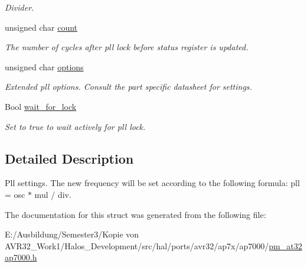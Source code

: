 \begin{CompactItemize}
\begin{CompactList}\small\item\em Divider. \item\end{CompactList}\item 
\hypertarget{structpm__pll__opt__t_11ff9f83ef3be9fda30369640c0a4017}{
unsigned char \hyperlink{structpm__pll__opt__t_11ff9f83ef3be9fda30369640c0a4017}{count}}
\label{structpm__pll__opt__t_11ff9f83ef3be9fda30369640c0a4017}

\begin{CompactList}\small\item\em The number of cycles after pll lock before status register is updated. \item\end{CompactList}\item 
\hypertarget{structpm__pll__opt__t_8b17faeaff4786ba22e3192e35e847be}{
unsigned char \hyperlink{structpm__pll__opt__t_8b17faeaff4786ba22e3192e35e847be}{options}}
\label{structpm__pll__opt__t_8b17faeaff4786ba22e3192e35e847be}

\begin{CompactList}\small\item\em Extended pll options. Consult the part specific datasheet for settings. \item\end{CompactList}\item 
\hypertarget{structpm__pll__opt__t_8c3eee8741e28978aa4a3618307499a2}{
Bool \hyperlink{structpm__pll__opt__t_8c3eee8741e28978aa4a3618307499a2}{wait\_\-for\_\-lock}}
\label{structpm__pll__opt__t_8c3eee8741e28978aa4a3618307499a2}

\begin{CompactList}\small\item\em Set to true to wait actively for pll lock. \item\end{CompactList}\end{CompactItemize}


\subsection{Detailed Description}
Pll settings. The new frequency will be set according to the following formula: pll = osc $\ast$ mul / div. 

The documentation for this struct was generated from the following file:\begin{CompactItemize}
\item 
E:/Ausbildung/Semester3/Kopie von AVR32\_\-Work1/Halos\_\-Development/src/hal/ports/avr32/ap7x/ap7000/\hyperlink{pm__at32ap7000_8h}{pm\_\-at32ap7000.h}\end{CompactItemize}
